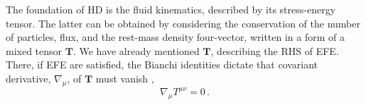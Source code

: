 %
%

The foundation of \ac{HD} is the fluid kinematics, described by its 
stress-energy tensor. The latter can be obtained by considering the 
conservation of the number of particles, flux, and the rest-mass density 
four-vector, written in a form of a mixed tensor $\boldsymbol{T}$.
We have already mentioned $\boldsymbol{T}$, describing the \ac{RHS} of \ac{EFE}.
There, if \ac{EFE} are satisfied, the Bianchi identities dictate that 
covariant derivative, $\nabla_{\mu}$, of $\boldsymbol{T}$ must vanish \ie, 
%
\begin{equation}
\nabla_{\mu}{T^{\mu\nu}} = 0\, .
\label{eq:theory:tmunu_eq_0}
\end{equation}
%

